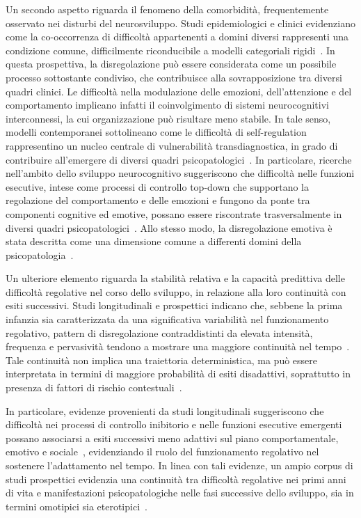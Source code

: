             Un secondo aspetto riguarda il fenomeno della comorbidità, frequentemente osservato nei disturbi del neurosviluppo. Studi epidemiologici e clinici evidenziano come la co-occorrenza di difficoltà appartenenti a domini diversi rappresenti una condizione comune, difficilmente riconducibile a modelli categoriali rigidi~\cite{astle2022}. In questa prospettiva, la disregolazione può essere considerata come un possibile processo sottostante condiviso, che contribuisce alla sovrapposizione tra diversi quadri clinici. Le difficoltà nella modulazione delle emozioni, dell'attenzione e del comportamento implicano infatti il coinvolgimento di sistemi neurocognitivi interconnessi, la cui organizzazione può risultare meno stabile. In tale senso, modelli contemporanei sottolineano come le difficoltà di self-regulation rappresentino un nucleo centrale di vulnerabilità transdiagnostica, in grado di contribuire all'emergere di diversi quadri psicopatologici~\cite{nigg2017}. In particolare, ricerche nell'ambito dello sviluppo neurocognitivo suggeriscono che difficoltà nelle funzioni esecutive, intese come processi di controllo top-down che supportano la regolazione del comportamento e delle emozioni e fungono da ponte tra componenti cognitive ed emotive, possano essere riscontrate trasversalmente in diversi quadri psicopatologici~\cite{zelazo2020}. Allo stesso modo, la disregolazione emotiva è stata descritta come una dimensione comune a differenti domini della psicopatologia~\cite{beauchaine2019}.

            Un ulteriore elemento riguarda la stabilità relativa e la capacità predittiva delle difficoltà regolative nel corso dello sviluppo, in relazione alla loro continuità con esiti successivi. Studi longitudinali e prospettici indicano che, sebbene la prima infanzia sia caratterizzata da una significativa variabilità nel funzionamento regolativo, pattern di disregolazione contraddistinti da elevata intensità, frequenza e pervasività tendono a mostrare una maggiore continuità nel tempo~\cite{calkins2007,eisenberg2010}. Tale continuità non implica una traiettoria deterministica, ma può essere interpretata in termini di maggiore probabilità di esiti disadattivi, soprattutto in presenza di fattori di rischio contestuali~\cite{rutter1989}.

            In particolare, evidenze provenienti da studi longitudinali suggeriscono che difficoltà nei processi di controllo inibitorio e nelle funzioni esecutive emergenti possano associarsi a esiti successivi meno adattivi sul piano comportamentale, emotivo e sociale~\cite{zelazo2020}, evidenziando il ruolo del funzionamento regolativo nel sostenere l'adattamento nel tempo. In linea con tali evidenze, un ampio corpus di studi prospettici evidenzia una continuità tra difficoltà regolative nei primi anni di vita e manifestazioni psicopatologiche nelle fasi successive dello sviluppo, sia in termini omotipici sia eterotipici~\cite{beauchaine2019,eisenberg2010,rutter1989}.

